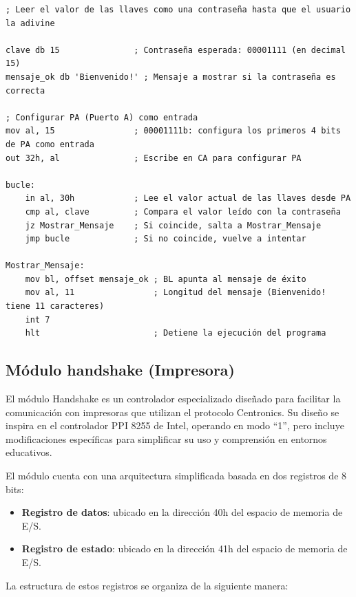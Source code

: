 \documentclass[12pt,oneside]{templates/unerthesis}
\providecommand{\tightlist}{%
  \setlength{\itemsep}{0pt}\setlength{\parskip}{0pt}}
\begin{document}
\begin{lstlisting}
; Leer el valor de las llaves como una contraseña hasta que el usuario la adivine

clave db 15               ; Contraseña esperada: 00001111 (en decimal 15)
mensaje_ok db 'Bienvenido!' ; Mensaje a mostrar si la contraseña es correcta

; Configurar PA (Puerto A) como entrada
mov al, 15                ; 00001111b: configura los primeros 4 bits de PA como entrada
out 32h, al               ; Escribe en CA para configurar PA

bucle:
    in al, 30h            ; Lee el valor actual de las llaves desde PA
    cmp al, clave         ; Compara el valor leído con la contraseña
    jz Mostrar_Mensaje    ; Si coincide, salta a Mostrar_Mensaje
    jmp bucle             ; Si no coincide, vuelve a intentar

Mostrar_Mensaje:
    mov bl, offset mensaje_ok ; BL apunta al mensaje de éxito
    mov al, 11                ; Longitud del mensaje (Bienvenido! tiene 11 caracteres)
    int 7
    hlt                       ; Detiene la ejecución del programa\end{lstlisting}

\hypertarget{muxf3dulo-handshake-impresora}{%
\subsection{Módulo handshake (Impresora)}\label{muxf3dulo-handshake-impresora}}

El módulo Handshake es un controlador especializado diseñado para facilitar la comunicación con impresoras que utilizan el protocolo Centronics. Su diseño se inspira en el controlador PPI 8255 de Intel, operando en modo ``1'', pero incluye modificaciones específicas para simplificar su uso y comprensión en entornos educativos.

El módulo cuenta con una arquitectura simplificada basada en dos registros de 8 bits:

\begin{itemize}
\tightlist
\item
  \textbf{Registro de datos}: ubicado en la dirección 40h del espacio de memoria de E/S.
\item
  \textbf{Registro de estado}: ubicado en la dirección 41h del espacio de memoria de E/S.
\end{itemize}

La estructura de estos registros se organiza de la siguiente manera:
\end{document}
